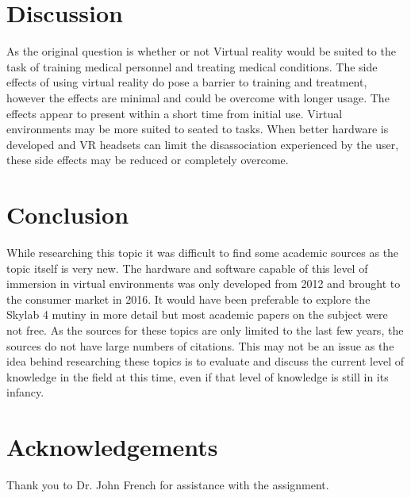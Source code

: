 \documentclass[10pt,journal,compsoc]{IEEEtran}
\begin{document}
\section{Discussion }

As the original question is whether or not Virtual reality would be suited to the task of training medical personnel and treating medical conditions. The side effects of using virtual reality do pose a barrier to training and treatment, however the effects are minimal and could be overcome with longer usage. The effects appear to present within a short time from initial use. Virtual environments may be more suited to seated to tasks. When better hardware is developed and VR headsets can limit the disassociation experienced by the user, these side effects may be reduced or completely overcome.

	\section{Conclusion}
	While researching this topic it was difficult to find some academic sources as the topic itself is very new. The hardware and software capable of this level of immersion in virtual environments was only developed from 2012 and brought to the consumer market in 2016. It would have been preferable to explore the Skylab 4 mutiny in more detail but most academic papers on the subject were not free. As the sources for these topics are only limited to the last few years, the sources do not have large numbers of citations. This may not be an issue as the idea behind researching these topics is to evaluate and discuss the current level of knowledge in the field at this time, even if that level of knowledge is still in its infancy. 

	\section{Acknowledgements}
	Thank you to Dr. John French for assistance with the assignment.
\end{document}
